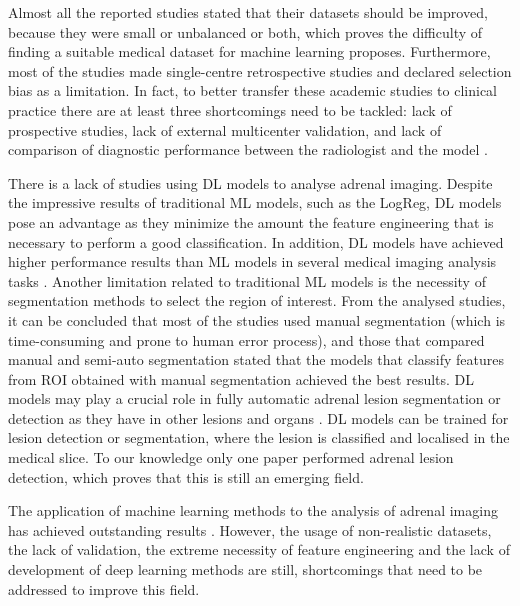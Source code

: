 \documentclass[11pt]{article}
\begin{document}
Almost all the reported studies stated that their datasets should be improved,
because they were small or unbalanced or both, which proves the difficulty of
finding a suitable medical dataset for machine learning proposes. Furthermore,
most of the studies made single-centre retrospective studies and declared
selection bias as a limitation. In fact, to better transfer these academic
studies to clinical practice there are at least three shortcomings need to be tackled: lack
of prospective studies, lack of external multicenter validation, and lack of
comparison of diagnostic performance between the radiologist and the model
\cite{Zhang2022}.

There is a lack of studies using DL models to analyse adrenal imaging. Despite
the impressive results of traditional ML models, such as the LogReg, DL models
pose an advantage as they minimize the amount the feature engineering that is
necessary to perform a good classification. In addition, DL models have achieved
higher performance results than ML models in several medical imaging analysis
tasks \cite{Suganyadevi2022}. Another limitation related to traditional ML
models is the necessity of segmentation methods to select the region of
interest. From the analysed studies, it can be concluded that most of the
studies used manual segmentation (which is time-consuming and prone to human
error process), and those that compared manual and semi-auto segmentation stated
that the models that classify features from ROI obtained with manual
segmentation achieved the best results. DL models may play a crucial role in fully
automatic adrenal lesion segmentation or detection as they have in other lesions
and organs \cite{Suganyadevi2022}. DL models can be trained for lesion detection
or segmentation, where the lesion is classified and localised in the medical
slice. To our knowledge only one paper performed adrenal lesion detection, which
proves that this is still an emerging field.

The application of machine learning methods to the analysis of adrenal imaging
has achieved outstanding results
\cite{Schieda2017,Yi20181,Yi2018,Kusunoki2022,Barstugan2020}. However, the usage
of non-realistic datasets, the lack of validation, the extreme necessity of
feature engineering and the lack of development of deep learning methods are
still, shortcomings that need to be addressed to improve this field.


\printbibliography
\end{document}
